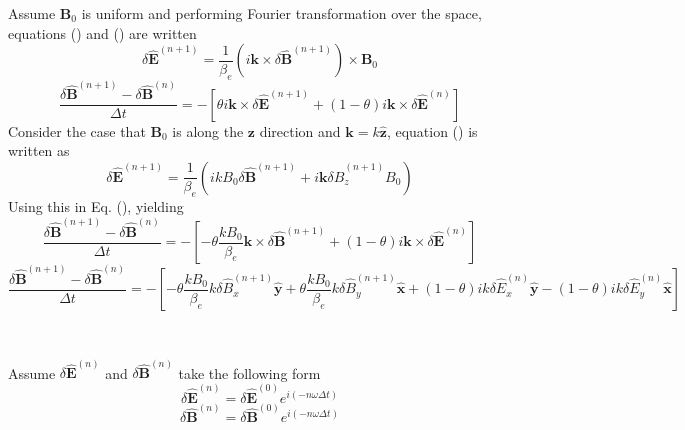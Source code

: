 \documentclass{article}
\begin{document}
Assume $\mathbf{B}_0$ is uniform and performing Fourier transformation over
the space, equations () and () are written
\begin{equation}
  \delta \hat{\mathbf{E}}^{(n + 1)} = \frac{1}{\beta_e} (i\mathbf{k} \times
  \delta \hat{\mathbf{B}}^{(n + 1)}) \times \mathbf{B}_0
\end{equation}
\begin{equation}
  \frac{\delta \hat{\mathbf{B}}^{(n + 1)} - \delta
  \hat{\mathbf{B}}^{(n)}}{\Delta t} = - [\theta i\mathbf{k} \times \delta
  \hat{\mathbf{E}}^{(n + 1)} + (1 - \theta) i\mathbf{k} \times \delta
  \hat{\mathbf{E}}^{(n)}]
\end{equation}
Consider the case that $\mathbf{B}_0$ is along the $\mathbf{z}$ direction and
$\mathbf{k}= k \hat{\mathbf{z}}$, equation () is written as
\begin{equation}
  \delta \hat{\mathbf{E}}^{(n + 1)} = \frac{1}{\beta_e} (i k B_0 \delta
  \hat{\mathbf{B}}^{(n + 1)} + i\mathbf{k} \delta \hat{B}_z^{(n + 1)} B_0)
\end{equation}
Using this in Eq. (), yielding
\begin{equation}
  \frac{\delta \hat{\mathbf{B}}^{(n + 1)} - \delta
  \hat{\mathbf{B}}^{(n)}}{\Delta t} = - \left[ - \theta \frac{k B_0}{\beta_e}
  \mathbf{k} \times \delta \hat{\mathbf{B}}^{(n + 1)} + (1 - \theta)
  i\mathbf{k} \times \delta \hat{\mathbf{E}}^{(n)} \right]
\end{equation}
\begin{equation}
  \frac{\delta \hat{\mathbf{B}}^{(n + 1)} - \delta
  \hat{\mathbf{B}}^{(n)}}{\Delta t} = - \left[ - \theta \frac{k B_0}{\beta_e}
  k \delta \hat{B}_x^{(n + 1)} \hat{\mathbf{y}} + \theta \frac{k B_0}{\beta_e}
  k \delta \hat{B}_y^{(n + 1)} \hat{\mathbf{x}} + (1 - \theta) i k \delta
  \hat{E}_x^{(n)} \hat{\mathbf{y}} - (1 - \theta) i k \delta \hat{E}_y^{(n)}
  \hat{\mathbf{x}} \right]
\end{equation}


\

Assume $\delta \hat{\mathbf{E}}^{(n)}$ and $\delta \hat{\mathbf{B}}^{(n)}$
take the following form
\begin{equation}
  \delta \hat{\mathbf{E}}^{(n)} = \delta \hat{\mathbf{E}}^{(0)} e^{i (- n
  \omega \Delta t)}
\end{equation}
\begin{equation}
  \delta \hat{\mathbf{B}}^{(n)} = \delta \hat{\mathbf{B}}^{(0)} e^{i (- n
  \omega \Delta t)}
\end{equation}
\end{document}
